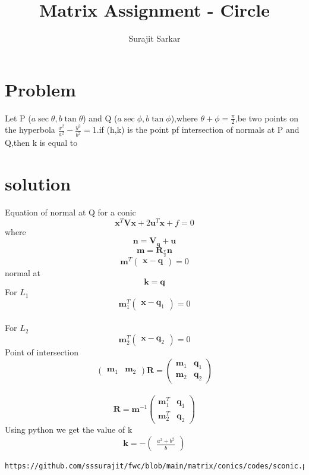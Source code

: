 \documentclass[journal,12pt,twocolumn]{IEEEtran}
\title{\mytitle}
\title
{
Matrix Assignment - Circle
}
\author{Surajit Sarkar}
\newcommand{\myvec}[1]{\ensuremath{\begin{pmatrix}#1\end{pmatrix}}}
\let\vec\mathbf
\begin{document}
\maketitle
\tableofcontents
\bigskip


\section{\textbf{Problem}}
Let P ($a\sec \theta,b \tan \theta$) and Q ($a\sec \phi,b\tan\phi$),where $\theta+\phi={\frac{\pi}{2}}$,be two points on the hyperbola $\frac{x^2}{a^2}-\frac{y^2}{b^2}=1$.if (h,k) is the point pf intersection of normals at P and Q,then k is equal to


\section{\textbf{solution}}

Equation of normal at Q for a conic
\begin{equation}
{\vec{{x}}^T{\vec V}{\vec x}+2{\vec u}^T{\vec x}}+f=0
\end{equation}
where
\begin{equation}
    \vec n=\vec {V_q+u}
\end{equation}
\begin{equation}
    \vec m=\vec R_{\frac{\pi}{2}}\vec n
\end{equation}
\begin{equation}
    \vec m^T\myvec{\vec {x-q}}=0
\end{equation}
normal at 
\begin{equation}
  \vec{  k = q}
\end{equation}
For $L_1$
\begin{equation}
    \vec m^T_1\myvec{\vec x-\vec q_1}=0
\end{equation}
\\
For $L_2$
\begin{equation}
    \vec m^T_2\myvec{\vec x-\vec q_2}=0
\end{equation}
Point of intersection
\begin{equation}
    \myvec{\vec {m}_1 &\vec {m}_2} \vec R=\myvec{\vec m_1 & \vec q_1 \\ \vec m_2 & \vec q_2 }
\end{equation}
\\
\begin{equation}
    \vec R =\vec m^{-1} \myvec{\vec m^T_1 & \vec q_1 \\ \vec m^T_2 & \vec q_2 }
\end{equation}
Using python we get the value of k
\begin{equation}
    \vec k=-\myvec{\frac{a^2+b^2}{b}}
\end{equation}
\begin{lstlisting}
https://github.com/sssurajit/fwc/blob/main/matrix/conics/codes/sconic.py
\end{lstlisting}
\end{document}
